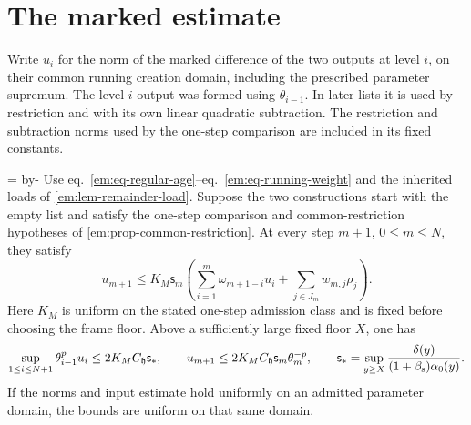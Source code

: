\documentclass[11pt,letterpaper,reqno]{amsart}
\makeatletter
\numberwithin{equation}{section}
\renewcommand{\eqref}[1]{\textup{eq.~\ref{#1}}}
\newcommand{\emneedspace}[1]{\par\begingroup
  \dimen0=\pagegoal\advance\dimen0 by-\pagetotal
  \ifdim\dimen0<#1\relax\newpage\fi\endgroup}
\theoremstyle{definition}
\newcommand{\ms@minorstart}{%
  \pushQED{\qed}\renewcommand{\qedsymbol}{$\blacksquare$}}
\newenvironment{proposition}[1][]{\ms@minorstart\ms@proposition[#1]}
  {\popQED\endms@proposition}
\theoremstyle{remark}
\makeatother
\begin{document}
\section{The marked estimate}
\label{em:sec-marked-recursion}

Write $u_i$ for the norm of the marked difference of the two
outputs at level $i$, on their common running creation domain,
including the prescribed parameter supremum. The level-$i$ output was formed using $\theta_{i-1}$.
In later lists it is used by restriction and with its own linear
quadratic subtraction. The restriction and subtraction norms used
by the one-step comparison are included in its fixed constants.

\emneedspace{18\baselineskip}
\begin{proposition}[Uniform marked recurrence]\label{em:prop-marked-recursion}
Use \eqref{em:eq-regular-age}--\eqref{em:eq-running-weight} and
the inherited loads of \cref{em:lem-remainder-load}. Suppose the
two constructions start with the empty list and satisfy the
one-step comparison and common-restriction hypotheses of
\cref{em:prop-common-restriction}. At every step $m+1$, $0\le m\le N$,
they satisfy
\begin{equation}\label{em:eq-marked-input}
  u_{m+1}\le K_M\mathsf s_m\left(
         \sum_{i=1}^m\omega_{m+1-i}u_i
                   +\sum_{j\in J_m}w_{m,j}\rho_j\right).
\end{equation}
Here $K_M$ is uniform on the stated one-step admission class and
is fixed before choosing the frame floor. Above a sufficiently
large fixed floor $X$, one has
\begin{equation}\label{em:eq-marked-envelope}
  \sup_{1\le i\le N+1}\theta_{i-1}^{p}u_i
        \le 2K_MC_{\mathfrak h}\mathsf s_* ,\qquad
  u_{m+1}\le 2K_MC_{\mathfrak h}\mathsf s_m\theta_m^{-p},
  \qquad
  \mathsf s_* =\sup_{y\ge X}
    \frac{\delta(y)}{(1+\beta_{\rm s})\alpha_0(y)}.
\end{equation}
If the norms and input estimate hold uniformly on an admitted
parameter domain, the bounds are uniform on that same domain.
\end{proposition}
\end{document}
